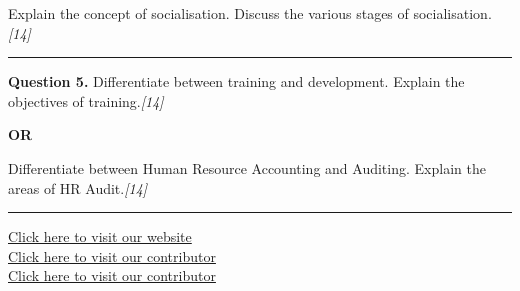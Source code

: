 \documentclass[11pt,a4paper]{article}
\newcommand{\pts}[1]{\hfill   \textit{[#1]}}
\begin{document}
Explain the concept of socialisation. Discuss the various stages of socialisation.\pts{14}

\medskip\rule{\linewidth}{0.2pt}




\noindent   \textbf{Question 5.}
Differentiate between training and development. Explain the objectives of training.\pts{14}

\centerline{   \textbf{OR}}

Differentiate between Human Resource Accounting and Auditing. Explain the areas of HR Audit.\pts{14}

\vfill
\rule{\linewidth}{0.4pt}

\begin{center}\small
\href{https://bhu-exam.vercel.app/}{Click here to visit our website}\\[4pt]
\href{https://me-aryan.vercel.app/}{Click here to visit our contributor}\\[4pt]
\href{https://quashan-me.vercel.app/}{Click here to visit our contributor}
\end{center}
\end{document}
